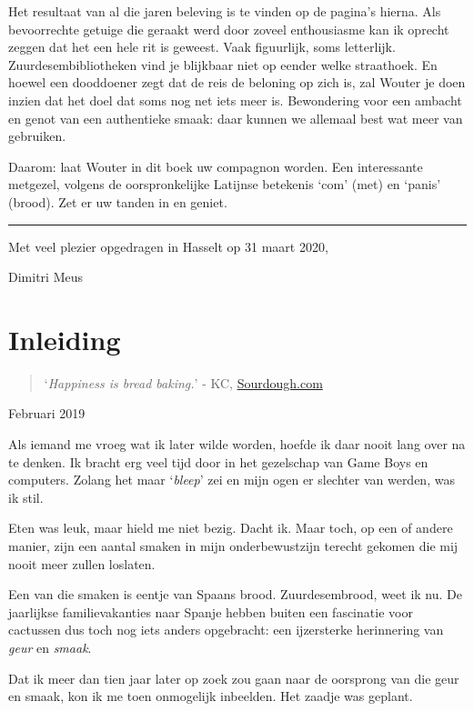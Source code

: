 \documentclass[
  11pt,
  dutch,
]{memoir}
\begin{document}
Het resultaat van al die jaren beleving is te vinden op de pagina's
hierna. Als bevoorrechte getuige die geraakt werd door zoveel
enthousiasme kan ik oprecht zeggen dat het een hele rit is geweest. Vaak
figuurlijk, soms letterlijk. Zuurdesembibliotheken vind je blijkbaar
niet op eender welke straathoek. En hoewel een dooddoener zegt dat de
reis de beloning op zich is, zal Wouter je doen inzien dat het doel dat
soms nog net iets meer is. Bewondering voor een ambacht en genot van een
authentieke smaak: daar kunnen we allemaal best wat meer van gebruiken.

Daarom: laat Wouter in dit boek uw compagnon worden. Een interessante
metgezel, volgens de oorspronkelijke Latijnse betekenis `com' (met) en
`panis' (brood). Zet er uw tanden in en geniet.

\pfbreak

Met veel plezier opgedragen in Hasselt op 31 maart 2020,

Dimitri Meus

\hypertarget{inleiding}{%
\chapter{Inleiding}\label{inleiding}}

\begin{quote}
`\emph{Happiness is bread baking.}' - KC,
\href{https://sourdough.com}{Sourdough.com}
\end{quote}

\begin{flushright}
Februari 2019
\end{flushright}

Als iemand me vroeg wat ik later wilde worden, hoefde ik daar nooit lang
over na te denken. Ik bracht erg veel tijd door in het gezelschap van
Game Boys en computers. Zolang het maar `\emph{bleep}' zei en mijn ogen
er slechter van werden, was ik stil.

Eten was leuk, maar hield me niet bezig. Dacht ik. Maar toch, op een of
andere manier, zijn een aantal smaken in mijn onderbewustzijn terecht
gekomen die mij nooit meer zullen loslaten.

Een van die smaken is eentje van Spaans brood. Zuurdesembrood, weet ik
nu. De jaarlijkse familievakanties naar Spanje hebben buiten een
fascinatie voor cactussen dus toch nog iets anders opgebracht: een
ijzersterke herinnering van \emph{geur} en \emph{smaak}.

Dat ik meer dan tien jaar later op zoek zou gaan naar de oorsprong van
die geur en smaak, kon ik me toen onmogelijk inbeelden. Het zaadje was
geplant.
\end{document}
